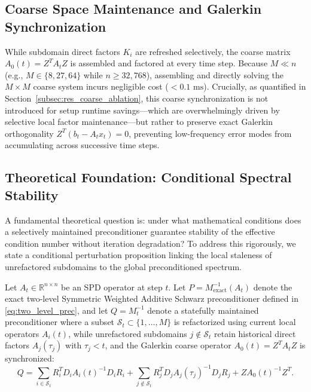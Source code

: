 \documentclass[preprint,12pt,3p]{elsarticle}
\begin{document}
\subsection{Coarse Space Maintenance and Galerkin Synchronization}
While subdomain direct factors $K_i$ are refreshed selectively, the coarse matrix $A_0(t) = Z^T A_t Z$ is assembled and factored at every time step. Because $M \ll n$ (e.g., $M \in \{8, 27, 64\}$ while $n \ge 32,768$), assembling and directly solving the $M \times M$ coarse system incurs negligible cost ($< 0.1\text{ ms}$). Crucially, as quantified in Section~\ref{subsec:res_coarse_ablation}, this coarse synchronization is not introduced for setup runtime savings---which are overwhelmingly driven by selective local factor maintenance---but rather to preserve exact Galerkin orthogonality $Z^T (b_t - A_t x_t) = 0$, preventing low-frequency error modes from accumulating across successive time steps.

\subsection{Theoretical Foundation: Conditional Spectral Stability}
\label{subsec:theory_stability}

A fundamental theoretical question is: under what mathematical conditions does a selectively maintained preconditioner guarantee stability of the effective condition number without iteration degradation? To address this rigorously, we state a conditional perturbation proposition linking the local staleness of unrefactored subdomains to the global preconditioned spectrum.

Let $A_t \in \mathbb{R}^{n \times n}$ be an SPD operator at step $t$. Let $P = M_{\text{exact}}^{-1}(A_t)$ denote the exact two-level Symmetric Weighted Additive Schwarz preconditioner defined in \eqref{eq:two_level_prec}, and let $Q = M_t^{-1}$ denote a statefully maintained preconditioner where a subset $\mathcal{S}_t \subset \{1, \dots, M\}$ is refactorized using current local operators $A_i(t)$, while unrefactored subdomains $j \notin \mathcal{S}_t$ retain historical direct factors $A_j(\tau_j)$ with $\tau_j < t$, and the Galerkin coarse operator $A_0(t) = Z^T A_t Z$ is synchronized:
\begin{equation}
Q = \sum_{i \in \mathcal{S}_t} R_i^T D_i A_i(t)^{-1} D_i R_i + \sum_{j \notin \mathcal{S}_t} R_j^T D_j A_j(\tau_j)^{-1} D_j R_j + Z A_0(t)^{-1} Z^T.
\label{eq:stateful_prec_decomp}
\end{equation}
\end{document}
